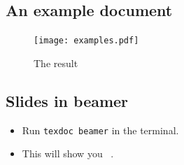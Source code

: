 \subsection{An example document}

\begin{frame}
  
\end{frame}

\begin{frame}
  \begin{figure}
    \texttt{[image: examples.pdf]}
    \caption{The result}
  \end{figure}
\end{frame}


\subsection{Slides in beamer}

%	

\begin{frame}
  \begin{remark}
    \begin{itemize}
      \item Run \lstinline{texdoc beamer} in the terminal.
      \item This will show you 
        ~\cite{beameruserguide}.
    \end{itemize}
  \end{remark}
\end{frame}

